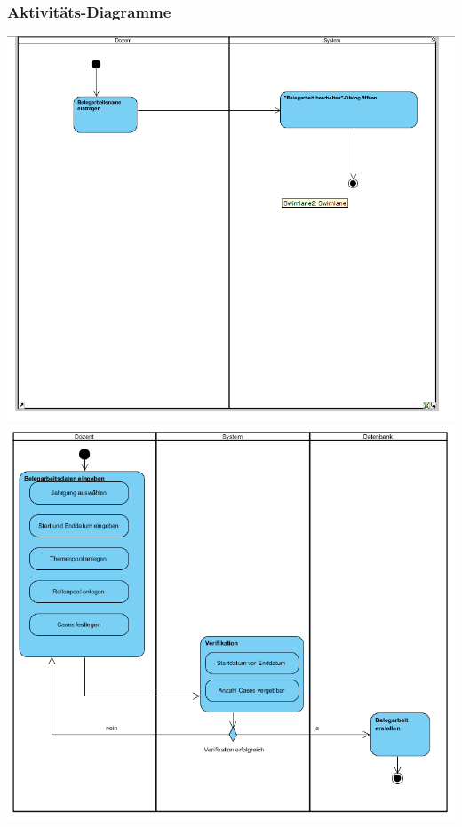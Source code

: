 \documentclass{article}
\begin{document}
\subsubsection{Aktivitäts-Diagramme}
\begin{center}
\includegraphics[scale=1]{bilder/Belegarbeit_erstellen_Activity.png}\\
\includegraphics[scale=1]{bilder/Belegarbeit_bearbeiten_Activity.png}\\

\end{center}
\end{document}

